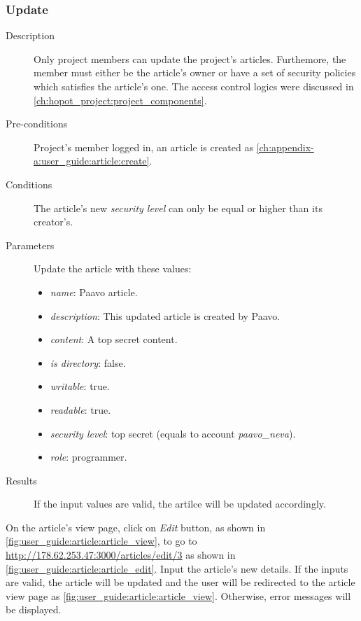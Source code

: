 \clearpage

\subsubsection{Update}
\label{ch:appendix-a:user_guide:article:update}

\begin{description}
\item[Description] Only project members can update the project's articles.
Furthemore, the member must either be the article's owner or have a set of security policies which satisfies the article's one.
The access control logics were discussed in \autoref{ch:hopot_project:project_components}.
\item[Pre-conditions] Project's member logged in, an article is created as \autoref{ch:appendix-a:user_guide:article:create}.
\item[Conditions] The article's new \emph{security level} can only be equal or higher than its creator's.
\item[Parameters] Update the article with these values:
\begin{itemize}
\item \emph{name}: Paavo article.
\item \emph{description}: This updated article is created by Paavo.
\item \emph{content}: A top secret content.
\item \emph{is directory}: false.
\item \emph{writable}: true.
\item \emph{readable}: true.
\item \emph{security level}: top secret (equals to account \emph{paavo\_neva}).
\item \emph{role}: programmer.
\end{itemize}
\item[Results] If the input values are valid, the artilce will be updated accordingly.
\end{description}

On the article's view page, click on \emph{Edit} button, as shown in \autoref{fig:user_guide:article:article_view}, to go to \href{http://178.62.253.47:3000/articles/edit/3}{http://178.62.253.47:3000/articles/edit/3} as shown in \autoref{fig:user_guide:article:article_edit}.
Input the article's new details.
If the inputs are valid, the article will be updated and the user will be redirected to the article view page as \autoref{fig:user_guide:article:article_view}.
Otherwise, error messages will be displayed.

